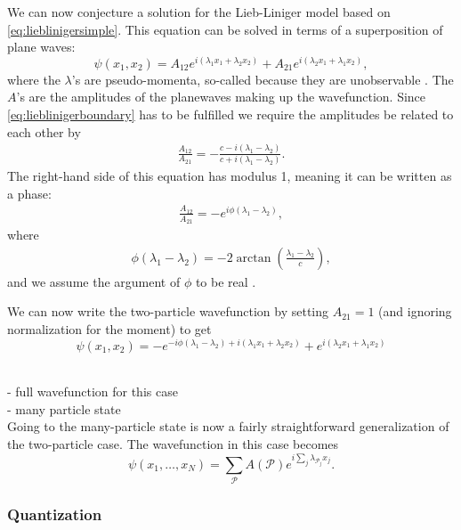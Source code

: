 \documentclass[11pt, a4paper]{report} %
\begin{document}
We can now conjecture a solution for the Lieb-Liniger model based on \cref{eq:lieblinigersimple}.
This equation can be solved in terms of a superposition of plane waves:
\begin{equation}
	\psi(x_1,x_2) = A_{12} e^{i(\lambda_1x_1 + \lambda_2 x_2)} + A_{21} e^{i(\lambda_2 x_1 + \lambda_1 x_2)},
\end{equation}
where the \(\lambda\)'s are pseudo-momenta, so-called because they are unobservable \cite{Franchini2017}.
The \(A\)'s are the amplitudes of the planewaves making up the wavefunction.
Since \cref{eq:lieblinigerboundary} has to be fulfilled we require the amplitudes be related to each other by
\begin{align}
	\frac{A_{12}}{A_{21}} = -\frac{c-i(\lambda_1 - \lambda_2) }{c+i(\lambda_1 - \lambda_2)}.
\end{align}
The right-hand side of this equation has modulus 1, meaning it can be written as a phase:
\begin{align}
	\frac{A_{12}}{A_{21}} = -e^{i\phi(\lambda_1-\lambda_2)},
\end{align}
where
\begin{align}
	\phi(\lambda_1-\lambda_2) = -2\arctan\left(\frac{\lambda_1-\lambda_2}{c}\right),
\end{align}
and we assume the argument of \(\phi\) to be real \cite{Lieb1963}.

We can now write the two-particle wavefunction by setting \(A_{21}=1\) (and ignoring normalization for the moment) to get
\begin{equation}
	\psi(x_1,x_2) = - e^{-i\phi(\lambda_1-\lambda_2)+i(\lambda_1x_1 + \lambda_2 x_2)} + e^{i(\lambda_2 x_1 + \lambda_1 x_2)}
\end{equation}

~\\
- full wavefunction for this case\\
- many particle state\\

Going to the many-particle state is now a fairly straightforward generalization of the two-particle case.
The wavefunction in this case becomes \cite{Franchini2017}
\begin{equation}
	\psi(x_1,\ldots,x_N) = \sum_{\mathcal{P}} A(\mathcal{P}) e^{i\sum_j \lambda_{\mathcal{P}_j} x_j}.
\end{equation}

\subsubsection{Quantization}
\end{document}
